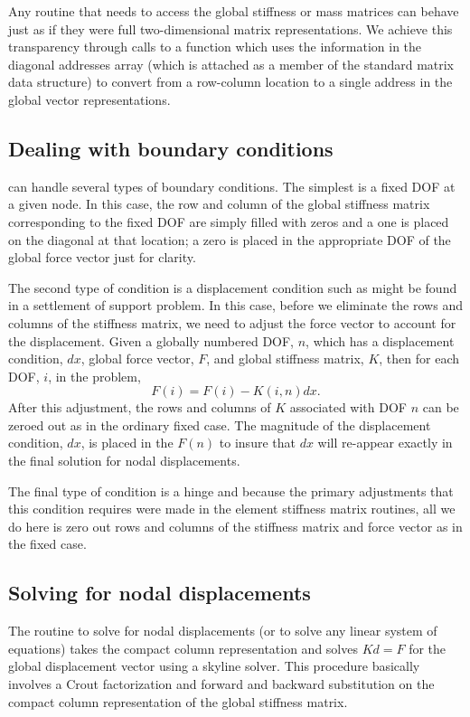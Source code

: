Any routine that needs to access the global stiffness or mass matrices
can behave just as if they were full two-dimensional matrix representations.
We achieve this transparency through calls to a function which uses the
information in the diagonal addresses array (which is attached as a member 
of the standard matrix data structure) to convert
from a row-column location to a single address in the global vector
representations.  

\subsection{Dealing with boundary conditions}

\felt{} can handle several types of boundary conditions.  The simplest
is a fixed DOF at a given node.  In this case, the row and column of the
global stiffness matrix corresponding to the fixed DOF are simply filled with 
zeros and a one is placed on the diagonal at that location; a zero is placed
in the appropriate DOF of the global force vector just for clarity.  

The second type of condition is a displacement condition such as might
be found in a settlement of support problem.  In this case, before we 
eliminate the rows and columns of the stiffness matrix, we need to adjust
the force vector to account for the displacement.  Given a globally
numbered DOF, $n$, which has a displacement condition, $dx$, global force 
vector, $F$, and global stiffness matrix, $K$, then for each DOF, $i$, in 
the problem, 
\begin{equation}
F(i) = F(i) - K(i,n)dx.
\end{equation}
After this adjustment, the rows and columns of $K$ associated with DOF $n$
can be zeroed out as in the ordinary fixed case.  The magnitude of the
displacement condition, $dx$, is placed in the $F(n)$ to insure that
$dx$ will re-appear exactly in the final solution for nodal displacements.

The final type of condition is a hinge and because the primary adjustments
that this condition requires were made in the element stiffness matrix 
routines, all we do here is zero out rows and columns of the stiffness matrix
and force vector as in the fixed case.

\subsection{Solving for nodal displacements}
The \felt{} routine to solve for nodal displacements (or to solve
any linear system of equations) takes the
compact column representation and solves $Kd=F$ for the global displacement 
vector using a skyline solver. This procedure basically involves 
a Crout factorization and forward and backward substitution on the compact
column representation of the global stiffness matrix.  	

